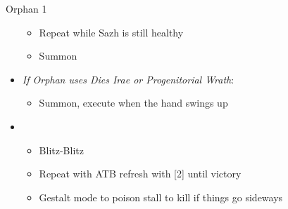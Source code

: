 \begin{battle}{Orphan 1}
\begin{multicols}{2}
\begin{itemize}
\begin{itemize}
        \item Repeat while Sazh is still healthy
        \item Summon
    \end{itemize}
    \item \textit{If Orphan uses Dies Irae or Progenitorial Wrath}:
    \begin{itemize}
        \item Summon, execute when the hand swings up
    \end{itemize}
    \item \first
    \begin{itemize}
        \item Blitz-Blitz
        \item Repeat with ATB refresh with [2] until victory
        \item Gestalt mode to poison stall to kill if things go sideways
    \end{itemize}
\end{itemize}
\end{multicols}
\end{battle}
